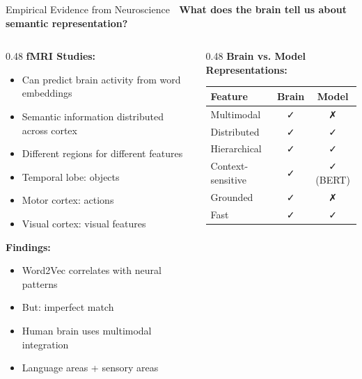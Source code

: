 \documentclass[aspectratio=169]{beamer}
\begin{document}
\begin{frame}[shrink=10]{Empirical Evidence from Neuroscience 🧬}
\textbf{What does the brain tell us about semantic representation?}

\vspace{1em}

\begin{columns}[T]
\begin{column}{0.48\textwidth}
\textbf{fMRI Studies:}
\begin{itemize}\setlength{\itemsep}{0pt}
    \item Can predict brain activity from word embeddings
    \item Semantic information distributed across cortex
    \item Different regions for different features
    \item Temporal lobe: objects
    \item Motor cortex: actions
    \item Visual cortex: visual features
\end{itemize}

\vspace{0.5em}
\textbf{Findings:}
\begin{itemize}\setlength{\itemsep}{0pt}
    \item Word2Vec correlates with neural patterns
    \item But: imperfect match
    \item Human brain uses multimodal integration
    \item Language areas + sensory areas
\end{itemize}
\end{column}

\begin{column}{0.48\textwidth}
\textbf{Brain vs. Model Representations:}

\vspace{0.5em}
\begin{tabular}{lcc}
\toprule
\textbf{Feature} & \textbf{Brain} & \textbf{Model} \\
\midrule
Multimodal & ✓ & ✗ \\
Distributed & ✓ & ✓ \\
Hierarchical & ✓ & ✓ \\
Context-sensitive & ✓ & ✓ (BERT) \\
Grounded & ✓ & ✗ \\
Fast & ✓ & ✓ \\
\bottomrule
\end{tabular}


\end{column}
\end{columns}
\end{frame}
\end{document}
